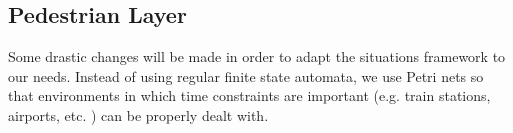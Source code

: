 \documentclass[11pt]{book}
\begin{document}

\subsection{Pedestrian Layer}
Some drastic changes will be made in order to adapt the situations framework to our needs. Instead of using regular finite state automata, we use Petri nets so that environments in which time constraints are important (e.g. train stations, airports, etc. ) can be properly dealt with.


\end{document}

